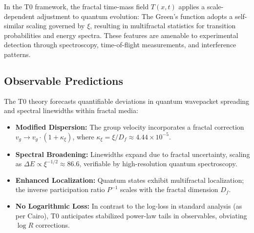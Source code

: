 	In the T0 framework, the fractal time-mass field $T(x,t)$ applies a scale-dependent adjustment to quantum evolution: The Green's function adopts a self-similar scaling governed by $\xi$, resulting in multifractal statistics for transition probabilities and energy spectra. These features are amenable to experimental detection through spectroscopy, time-of-flight measurements, and interference patterns.
	
	\subsection{Observable Predictions}
	
	The T0 theory forecasts quantifiable deviations in quantum wavepacket spreading and spectral linewidths within fractal media:
	
	\begin{itemize}
		\item \textbf{Modified Dispersion:} The group velocity incorporates a fractal correction $v_g \to v_g \cdot (1 + \kappa_\xi)$, where $\kappa_\xi = \xi / D_f \approx 4.44 \times 10^{-5}$.
		\item \textbf{Spectral Broadening:} Linewidths expand due to fractal uncertainty, scaling as $\Delta E \propto \xi^{-1/2} \approx 86.6$, verifiable by high-resolution quantum spectroscopy.
		\item \textbf{Enhanced Localization:} Quantum states exhibit multifractal localization; the inverse participation ratio $P^{-1}$ scales with the fractal dimension $D_f$.
		\item \textbf{No Logarithmic Loss:} In contrast to the log-loss in standard analysis (as per Cairo), T0 anticipates stabilized power-law tails in observables, obviating $\log R$ corrections.
	\end{itemize}
	
	\begin{table}[htbp]
		\centering
		\caption{Observable Predictions of T0 in Fractal Quantum Systems}
		\label{tab:t0_predictions}
	\end{table}
	
